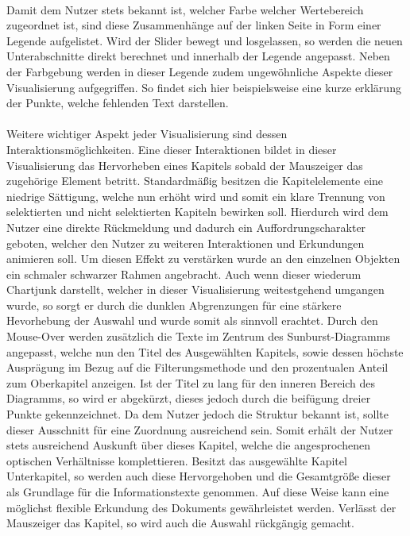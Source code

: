 \\
Damit dem Nutzer stets bekannt ist, welcher Farbe welcher Wertebereich zugeordnet ist, sind diese Zusammenh\"ange auf der linken Seite in Form einer Legende aufgelistet. Wird der Slider bewegt und losgelassen, so werden die neuen Unterabschnitte direkt berechnet und innerhalb der Legende angepasst. Neben der Farbgebung werden in dieser Legende zudem ungew\"ohnliche Aspekte dieser Visualisierung aufgegriffen. So findet sich hier beispielsweise eine kurze erkl\"arung der Punkte, welche fehlenden Text darstellen.\\
\\
Weitere wichtiger Aspekt jeder Visualisierung sind dessen Interaktionsm\"oglichkeiten. Eine dieser Interaktionen bildet in dieser Visualisierung das Hervorheben eines Kapitels sobald der Mauszeiger das zugeh\"orige Element betritt. Standardm\"a{\ss}ig besitzen die Kapitelelemente eine niedrige S\"attigung, welche nun erh\"oht wird und somit ein klare Trennung von selektierten und nicht selektierten Kapiteln bewirken soll. Hierdurch wird dem Nutzer eine direkte R\"uckmeldung und dadurch ein Auffordrungscharakter geboten, welcher den Nutzer zu weiteren Interaktionen und Erkundungen animieren soll. Um diesen Effekt zu verst\"arken wurde an den einzelnen Objekten ein schmaler schwarzer Rahmen angebracht. Auch wenn dieser wiederum Chartjunk darstellt, welcher in dieser Visualisierung weitestgehend umgangen wurde, so sorgt er durch die dunklen Abgrenzungen f\"ur eine st\"arkere Hevorhebung der Auswahl und wurde somit als sinnvoll erachtet. 
Durch den Mouse-Over werden zus\"atzlich die Texte im Zentrum des Sunburst-Diagramms angepasst, welche nun den Titel des Ausgew\"ahlten Kapitels, sowie dessen h\"ochste Auspr\"agung im Bezug auf die Filterungsmethode und den prozentualen Anteil zum Oberkapitel anzeigen. Ist der Titel zu lang f\"ur den inneren Bereich des Diagramms, so wird er abgek\"urzt, dieses jedoch durch die beif\"ugung dreier Punkte gekennzeichnet. Da dem Nutzer jedoch die Struktur bekannt ist, sollte dieser Ausschnitt f\"ur eine Zuordnung ausreichend sein. Somit erh\"alt der Nutzer stets ausreichend Auskunft \"uber dieses Kapitel, welche die angesprochenen optischen Verh\"altnisse komplettieren. Besitzt das ausgew\"ahlte Kapitel Unterkapitel, so werden auch diese Hervorgehoben und die Gesamtgr\"o{\ss}e dieser als Grundlage f\"ur die Informationstexte genommen. Auf diese Weise kann eine m\"oglichst flexible Erkundung des Dokuments gew\"ahrleistet werden. Verl\"asst der Mauszeiger das Kapitel, so wird auch die Auswahl r\"uckg\"angig gemacht.\\
